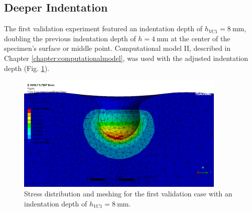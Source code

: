 \subsection{Deeper Indentation}
\label{subsection:8mm}
The first validation experiment featured an indentation depth of $h_{VC1}=\SI{8}{\milli \meter}$,
doubling the previous indentation depth of $h=\SI{4}{\milli \meter}$ at the center of the specimen's 
surface or middle point. Computational model II, described in Chapter \ref{chapter:computationalmodel},
was used with the adjusted indentation depth (Fig. \ref{fig:stressdis8mm}).\\

\begin{figure}%
	\centering
   \quad
   \includegraphics[width=10cm]{Images/validationcase/8mm/setstressdistribution.png}%
   \caption[Deeper Indentation - Stress distribution]{Stress distribution and meshing for the first validation case with an indentation depth of $h_{VC1}=\SI{8}{\milli \meter}$.}%
   \label{fig:stressdis8mm}%
\end{figure}

